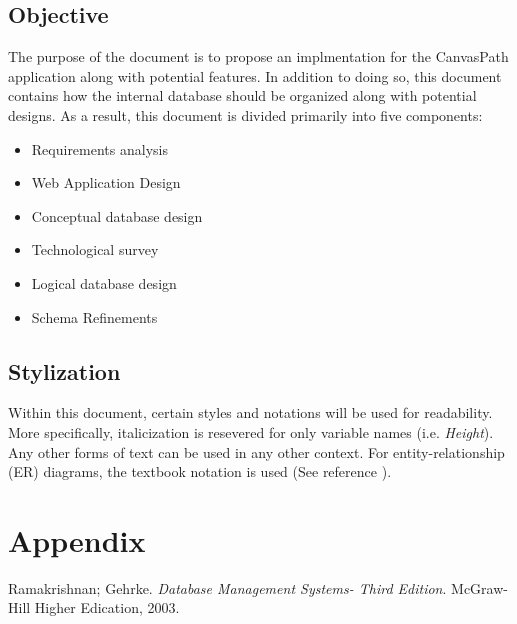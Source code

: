 \documentclass{article}
\begin{document}
  \subsection{Objective}\label{sec:Introduction:Objective}
    The purpose of the document is to propose an implmentation for the CanvasPath application along with potential features.  In addition to doing so, this document contains how the internal database should be organized along with potential designs.  As a result, this document is divided primarily into five components:
    \begin{itemize}
      \item Requirements analysis
      \item Web Application Design
      \item Conceptual database design
      \item Technological survey
      \item Logical database design
      \item Schema Refinements
    \end{itemize}

  \medskip

  \subsection{Stylization}\label{sec:Introduction:Stylization}
    Within this document, certain styles and notations will be used for readability.  More specifically, italicization is resevered for only variable names (i.e. \textit{Height}).  Any other forms of text can be used in any other context.  For entity-relationship (ER) diagrams, the textbook notation is used (See reference \cite{textbook}).

  \newpage


  \section{Appendix}\label{sec:Appendix}

  \medskip


  \begin{thebibliography}{1}

    Ramakrishnan; Gehrke.
    \textit{Database Management Systems- Third Edition}.
    McGraw-Hill Higher Edication, 2003.

  \end{thebibliography}
\end{document}
